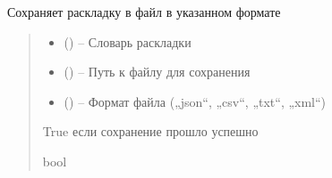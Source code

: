 \documentclass[a4paper,11pt,russian,openany,oneside]{sphinxmanual}
\begin{document}
\begin{savenotes}\begin{fulllineitems}
\label{\detokenize{_autosummary/scan_module.read_layout:scan_module.read_layout.save_layout_to_file}}
\pysigstartsignatures
\pysiglinewithargsret
{}
{\sphinxparamcomma {}\sphinxparamcomma {}}
{}
\pysigstopsignatures
\sphinxAtStartPar
Сохраняет раскладку в файл в указанном формате
\begin{quote}\begin{description}
\begin{itemize}
\item {} 
\sphinxAtStartPar
{} () – Словарь раскладки

\item {} 
\sphinxAtStartPar
{} () – Путь к файлу для сохранения

\item {} 
\sphinxAtStartPar
{} () – Формат файла („json“, „csv“, „txt“, „xml“)

\end{itemize}

\sphinxAtStartPar
True если сохранение прошло успешно

\sphinxAtStartPar
bool

\end{description}\end{quote}

\end{fulllineitems}\end{savenotes}

\end{document}
